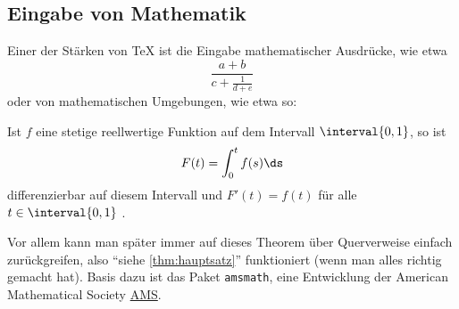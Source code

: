 \subsection{Eingabe von Mathematik}\label{subsec:eingabe-mathe}
Einer der Stärken von \TeX{} ist die Eingabe mathematischer Ausdrücke, wie etwa
%
\[
	\frac{ a+b }{ c+ \frac{ 1 }{ d+e } }
\]
%
oder von mathematischen Umgebungen, wie etwa so:
%
\begin{theorem}\label{thm:hauptsatz}
%	
Ist $ f $ eine stetige reellwertige Funktion auf dem Intervall\/ $ \interval{0,1} $, so ist
%
\[
  	F( t ) = \int_{ 0 }^{ t } f(s) \ds
\]
%
differenzierbar auf diesem Intervall und $ F'(t) = f(t) $ für alle $ t \in \interval{0,1} $ .
\end{theorem}
%
Vor allem kann man später immer auf dieses Theorem über Querverweise einfach zurückgreifen, also \enquote{siehe \cref{thm:hauptsatz}} funktioniert (wenn man alles richtig gemacht hat).
Basis dazu ist das Paket \texttt{amsmath}, eine Entwicklung der American Mathematical Society \href{https://de.wikipedia.org/wiki/American_Mathematical_Society}{AMS}.

